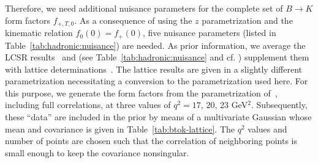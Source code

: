 \documentclass[twocolumn,epjc3]{svjour3}
\numberwithin{equation}{section}
\def \reftab#1{Table~\ref{#1}}
\renewcommand{\[}{\big[}
\renewcommand{\]}{\big]}
\renewcommand{\(}{\big(}
\renewcommand{\)}{\big)}
\begin{document}
{Therefore, we need} additional nuisance parameters for the
complete set of $B\to K$ form factors $f_{+,T,0}$. As a consequence of using the
$z$ parametrization \cite{Khodjamirian:2010vf} and the kinematic relation
$f_0(0) = f_+(0)$, five nuisance parameters (listed in
\reftab{tab:hadronic:nuisance}) are needed. As prior information, we average the
LCSR results~\cite{Khodjamirian:2010vf} and \cite{Ball:2004ye} (see
\reftab{tab:hadronic:nuisance} and cf. \cite{Beaujean:2013soa}) supplement them
with lattice determinations~\cite{Bouchard:2013eph}.
The lattice results are given in a slightly different parametrization
necessitating a conversion to the parametrization used here. For this purpose,
we generate the form factors from the parametrization
of~\cite{Bouchard:2013eph}, including full correlations, at three values of $q^2
= 17,\, 20,\, 23$ GeV$^2$.  Subsequently, these ``data'' are included in the
prior by means of a multivariate Gaussian whose mean and covariance is given in
\reftab{tab:btok-lattice}. The $q^2$ values and number of points are chosen such
that the correlation of neighboring points is small enough to keep the
covariance nonsingular.
\end{document}
